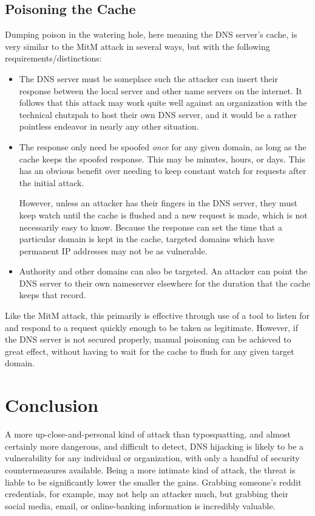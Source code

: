 \documentclass{article}
\begin{document}
\subsection{Poisoning the Cache}
	Dumping poison in the watering hole, here meaning the DNS server's
	cache, is very similar to the MitM attack in several ways, but with the
	following requirements/distinctions:
	\begin{itemize}
		\item The DNS server must be someplace such the attacker can
			insert their response between the local server and
			other name servers on the internet. It follows that
			this attack may work quite well against an organization
			with the technical chutzpah to host their own DNS
			server, and it would be a rather pointless endeavor in
			nearly any other situation.
		\item The response only need be spoofed {\em once} for any
			given domain, as long as the cache keeps the spoofed
			response. This may be minutes, hours, or days. This has
			an obvious benefit over needing to keep constant watch
			for requests after the initial attack.
			
			However, unless an attacker has their fingers in the
			DNS server, they must keep watch until the cache is
			flushed and a new request is made, which is not
			necessarily easy to know. Because the response can set
			the time that a particular domain is kept in the cache,
			targeted domains which have permanent IP addresses may
			not be as vulnerable.
		\item Authority and other domains can also be targeted. An
			attacker can point the DNS server to their own
			nameserver elsewhere for the duration that the cache
			keeps that record.
	\end{itemize}

	Like the MitM attack, this primarily is effective through use of a tool
	to listen for and respond to a request quickly enough to be taken as
	legitimate. However, if the DNS server is not secured properly, manual
	poisoning can be achieved to great effect, without having to wait for
	the cache to flush for any given target domain.

\section{Conclusion}

	A more up-close-and-personal kind of attack than typosquatting, and
	almost certainly more dangerous, and difficult to detect, DNS hijacking
	is likely to be a vulnerability for any individual or organization,
	with only a handful of security countermeasures available. Being a
	more intimate kind of attack, the threat is liable to be significantly
	lower the smaller the gains. Grabbing someone's reddit credentials, for
	example, may not help an attacker much, but grabbing their social
	media, email, or online-banking information is incredibly valuable.
\end{document}
